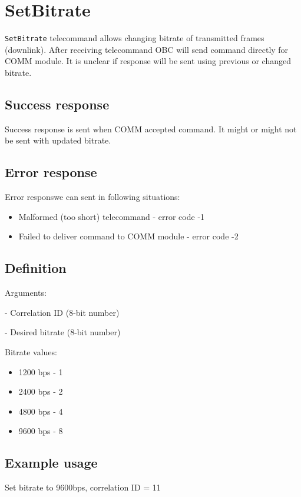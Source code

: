 \section{SetBitrate}
\texttt{SetBitrate} telecommand allows changing bitrate of transmitted frames (downlink). After receiving telecommand OBC will send command directly for COMM module. It is unclear if response will be sent using previous or changed bitrate. 

\subsection{Success response}
Success response is sent when COMM accepted command. It might or might not be sent with updated bitrate.

\subsection{Error response}
Error responswe can sent in following situations:
\begin{itemize}
	\item Malformed (too short) telecommand - error code -1
	\item Failed to deliver command to COMM module - error code -2
\end{itemize}

\subsection{Definition}

Arguments: 
\begin{description}[labelindent=1cm]
	\item[\texttt{correlation\_id}] - Correlation ID (8-bit number)
	\item[\texttt{bitrate}] - Desired bitrate (8-bit number) 
\end{description}

Bitrate values:
\begin{itemize}
	\item 1200 bps - 1
	\item 2400 bps - 2
	\item 4800 bps - 4
	\item 9600 bps - 8
\end{itemize}


\subsection{Example usage}
Set bitrate to 9600bps, correlation ID = 11


